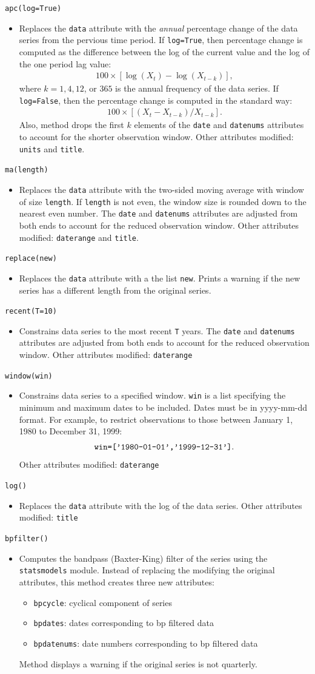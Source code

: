 \documentclass[11pt,fleqn]{article}
\newcommand{\EE}{\begin{eqnarray}}
\newcommand{\FF}{\end{eqnarray}}
\newcommand{\IZ}{\begin{itemize}}
\newcommand{\ZI}{\end{itemize}}
\newcommand{\itemb}{\item[]}
\newcommand{\ttt}{\texttt}
\begin{document}
	\itemb \ttt{apc(log=True)}
		\IZ
		\itemb Replaces the \ttt{data} attribute with the \emph{annual} percentage change of the data series from the pervious time period. If \ttt{log=True}, then percentage change is computed as the difference between the log of the current value and the log of the one period lag value:
			\EE
			100 \times \left[\log(X_t) - \log(X_{t-k})\right],
			\FF
		where $k=1,4,12$, or $365$ is the annual frequency of the data series. If \ttt{log=False}, then the percentage change is computed in the standard way:
			\EE
			100 \times \left[(X_t - X_{t-k})/X_{t-k}\right].
			\FF
		Also, method drops the first $k$ elements of the \ttt{date} and \ttt{datenums} attributes to account for the shorter observation window. Other attributes modified: \ttt{units} and \ttt{title}.
		\ZI
	
	\itemb \ttt{ma(length)}
		\IZ
		\itemb Replaces the \ttt{data} attribute with the two-sided moving average with window of size \ttt{length}. If \ttt{length} is not even, the window size is rounded down to the nearest even number. The \ttt{date} and \ttt{datenums} attributes are adjusted from both ends to account for the reduced observation window. Other attributes modified: \ttt{daterange} and \ttt{title}.
		\ZI
		
	\itemb \ttt{replace(new)}
		\IZ
		\itemb Replaces the \ttt{data} attribute with a the list \ttt{new}. Prints a warning if the new series has a different length from the original series.
		\ZI
		
	\itemb \ttt{recent(T=10)}
		\IZ
		\itemb Constrains data series to the most recent \ttt{T} years. The \ttt{date} and \ttt{datenums} attributes are adjusted from both ends to account for the reduced observation window. Other attributes modified: \ttt{daterange}
		\ZI
		
	\itemb \ttt{window(win)}
		\IZ
		\itemb Constrains data series to a specified window. \ttt{win} is a list specifying the minimum and maximum dates to be included. Dates must be in yyyy-mm-dd format. For example, to restrict observations to those between January 1, 1980 to December 31, 1999:
			\EE
			\verb!win=['1980-01-01','1999-12-31']!.
			\FF
		Other attributes modified: \ttt{daterange}
		\ZI
		
	\itemb \ttt{log()}
		\IZ
		\itemb Replaces the \ttt{data} attribute with the log of the data series. Other attributes modified: \ttt{title}
		\ZI
		
	\itemb \ttt{bpfilter()}
		\IZ
		\itemb Computes the bandpass (Baxter-King) filter of the series using the \ttt{statsmodels} module. Instead of replacing the modifying the original attributes, this method creates three new attributes:
			\IZ
            \itemb \ttt{bpcycle}: cyclical component of series
            \itemb \ttt{bpdates}: dates corresponding to bp filtered data
            \itemb \ttt{bpdatenums}: date numbers corresponding to bp filtered data
            \ZI
        Method displays a warning if the original series is not quarterly.
		\ZI
	
\end{document}
